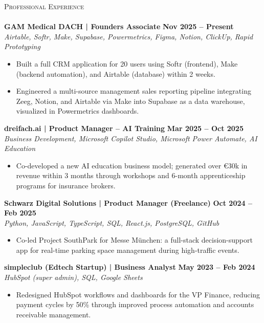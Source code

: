 \documentclass[a4paper]{article}
\newcommand{\lineunder} {
    \vspace*{-8pt} \\
    \hspace*{-18pt} \hrulefill \\
}
\newcommand{\header} [1] {
    {\hspace*{-18pt}\vspace*{6pt} \textsc{#1}}
    \vspace*{-6pt} \lineunder
}
\begin{document}
\header{Professional Experience}
\textbf{GAM Medical DACH | Founders Associate} \hfill \textbf{Nov 2025 -- Present}\\
\textit{Airtable, Softr, Make, Supabase, Powermetrics, Figma, Notion, ClickUp, Rapid Prototyping}
\vspace{-2mm}
\begin{itemize} \itemsep -2pt
    \item Built a full CRM application for 20 users using Softr (frontend), Make (backend automation), and Airtable (database) within 2 weeks.
    \item Engineered a multi-source management sales reporting pipeline integrating Zeeg, Notion, and Airtable via Make into Supabase as a data warehouse, visualized in Powermetrics dashboards.
\end{itemize}
\vspace{-1mm}
\textbf{dreifach.ai | Product Manager -- AI Training} \hfill \textbf{Mar 2025 -- Oct 2025}\\
\textit{Business Development, Microsoft Copilot Studio, Microsoft Power Automate, AI Education}
\vspace{-2mm}
\begin{itemize} \itemsep -2pt
    \item Co-developed a new AI education business model; generated over \euro30k in revenue within 3 months through workshops and 6-month apprenticeship programs for insurance brokers.
\end{itemize}
\vspace{-1mm}
\textbf{Schwarz Digital Solutions | Product Manager (Freelance)} \hfill \textbf{Oct 2024 -- Feb 2025}\\
\textit{Python, JavaScript, TypeScript, SQL, React.js, PostgreSQL, GitHub}
\vspace{-2mm}
\begin{itemize} \itemsep -2pt
	\item Co-led Project SouthPark for Messe München: a full-stack decision-support app for real-time parking space management during high-traffic events.
\end{itemize}
\vspace{-1mm}
\textbf{simpleclub (Edtech Startup) | Business Analyst} \hfill \textbf{May 2023 -- Feb 2024}\\
\textit{HubSpot (super admin), SQL, Google Sheets}
\vspace{-2mm}
\begin{itemize} \itemsep -2pt
	\item Redesigned HubSpot workflows and dashboards for the VP Finance, reducing payment cycles by 50\% through improved process automation and accounts receivable management.
\end{itemize}
\end{document}

